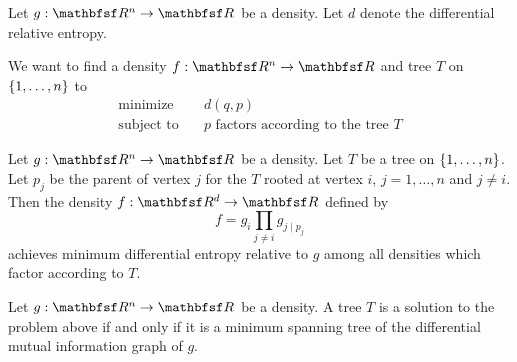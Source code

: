 Let $g: \R^n \to \R$ be a density.
Let $d$ denote the differential
relative entropy.

We want to find a density $f: \R^n \to \R$
and tree $T$ on
$\{1, \dots, n\}$ to
\[
  \begin{aligned}
    \text{minimize}   &\quad d(q, p) \\
    \text{subject to} &\quad p \text{ factors according to the tree } T
  \end{aligned}
\]


\begin{prop}
  Let $g: \R^n \to \R$ be a density.
  Let $T$ be
  a tree on $\{1, \dots, n\}$.
  Let $p_j$ be
  the parent of vertex $j$ for the $T$ rooted
  at vertex $i$, $j = 1,\dots,n$ and $j \neq i$.
  Then the density $f: \R^d \to \R$ defined by
  \[
    f = g_i \prod_{j \neq i} g_{j \mid p_j}
  \]
  achieves minimum differential entropy relative to $g$ among
  all densities which factor according to $T$.
\end{prop}

\begin{prop}
  Let $g: \R^n \to \R$ be a density.
  A tree $T$ is a solution to the problem above
  if and only if it is a minimum spanning
  tree of the differential mutual information graph of $g$.
\end{prop}
\strats
